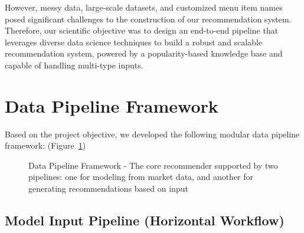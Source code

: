 \documentclass[
  11pt,
  a4paper,
  DIV=11,
  numbers=noendperiod]{scrartcl}
\begin{document}
However, messy data, large-scale datasets, and customized menu item
names posed significant challenges to the construction of our
recommendation system. Therefore, our scientific objective was to design
an end-to-end pipeline that leverages diverse data science techniques to
build a robust and scalable recommendation system, powered by a
popularity-based knowledge base and capable of handling multi-type
inputs.

\newpage

\section{Data Pipeline Framework}\label{data-pipeline-framework}

Based on the project objective, we developed the following modular data
pipeline framework: (Figure~\ref{fig-data-pipeline-overview})

\begin{figure}

\caption{\label{fig-data-pipeline-overview}Data Pipeline Framework - The
core recommender supported by two pipelines: one for modeling from
market data, and another for generating recommendations based on input}


\end{figure}%

\subsection{Model Input Pipeline (Horizontal
Workflow)}\label{model-input-pipeline-horizontal-workflow}
\end{document}
